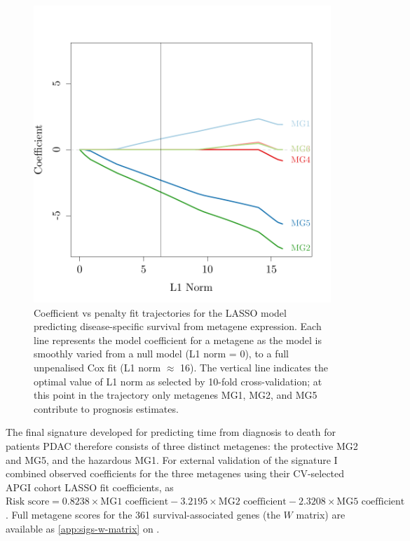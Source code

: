 \documentclass[dissertation.tex]{subfiles}
\begin{document}
\begin{figure}
\centering
\includegraphics[width=.7\linewidth]{analysis/biosurv/reports/18_SIS_diag_dsd_final/figure/nmf-metagene-glmnet-plots-2}
\caption{Coefficient vs penalty fit trajectories for the \acrshort{LASSO} model predicting disease-specific survival from metagene expression.  Each line represents the model coefficient for a metagene as the model is smoothly varied from a null model (L1 norm = 0), to a full unpenalised Cox fit (L1 norm $\approx$ 16).  The vertical line indicates the optimal value of L1 norm as selected by 10-fold cross-validation; at this point in the trajectory only metagenes MG1, MG2, and MG5 contribute to prognosis estimates.\label{fig:sigs-resub-lasso-track}}
\end{figure}

The final signature developed for predicting time from diagnosis to death for patients \gls{PDAC} therefore consists of three distinct metagenes: the protective MG2 and MG5, and the hazardous MG1.  For external validation of the signature I combined observed coefficients for the three metagenes using their CV-selected \gls{APGI} cohort \gls{LASSO} fit coefficients, as $\text{Risk score} = 0.8238 \times \text{MG1 coefficient} - 3.2195 \times \text{MG2 coefficient} - 2.3208 \times \text{MG5 coefficient}$.  Full metagene scores for the 361 survival-associated genes (the $W$ matrix) are available as \cref{app:sigs-w-matrix} on .
\end{document}
